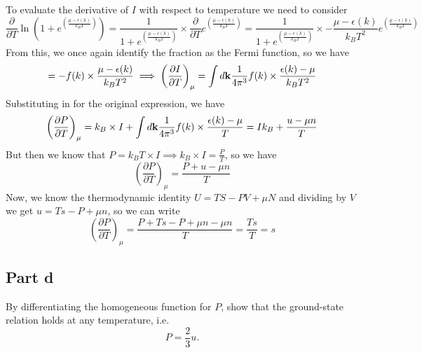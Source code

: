 \documentclass[12pt]{article}
\begin{document}
To evaluate the derivative of $I$ with respect to temperature we need to consider
\begin{equation}
    \frac{\partial}{\partial T} \ln \left( 1 + e^{ \left( \frac{\mu - \epsilon(k)}{k_B T} \right)} \right) = \frac{1}{1 + e^{ \left( \frac{\mu - \epsilon(k)}{k_B T} \right)}} \times \frac{\partial}{\partial T} e^{ \left( \frac{\mu - \epsilon(k)}{k_B T} \right)} = \frac{1}{1 + e^{ \left( \frac{\mu - \epsilon(k)}{k_B T} \right)}} \times -\frac{\mu - \epsilon(k)}{k_B T^2} e^{ \left( \frac{\mu - \epsilon(k)}{k_B T} \right)}
\end{equation}
From this, we once again identify the fraction as the Fermi function, so we have
\begin{equation}
    = - f(k) \times \frac{\mu - \epsilon(k)}{k_B T^2} \implies \left( \frac{\partial I}{\partial T} \right)_\mu = \int d \vb{k} \frac{1}{4\pi^3} f(k) \times \frac{\epsilon(k) - \mu}{k_B T^2}
\end{equation}
Substituting in for the original expression, we have
\begin{equation}
    \left( \frac{\partial P}{\partial T} \right)_\mu = k_B \times I + \int d \vb{k} \frac{1}{4\pi^3} f(k) \times \frac{\epsilon(k) - \mu}{T} = I k_B + \frac{u-\mu n}{T}
\end{equation}
But then we know that $P=k_B T \times I \implies k_B \times I = \frac{P}{T}$, so we have
\begin{equation}
    \left( \frac{\partial P}{\partial T} \right)_\mu = \frac{P+u-\mu n}{T}
\end{equation}
Now, we know the thermodynamic identity $U = TS - PV + \mu N$ and dividing by $V$ we get $u = Ts - P + \mu n$, so we can write
\begin{equation}
    \left( \frac{\partial P}{\partial T} \right)_\mu = \frac{P+Ts-P+\mu n-\mu n}{T} = \frac{Ts}{T} = s
\end{equation}
\subsection{Part d}
By differentiating the homogeneous function for $P$, show that the ground-state relation holds at any temperature, i.e.
\[
P = \frac{2}{3} u.
\]
\end{document}
